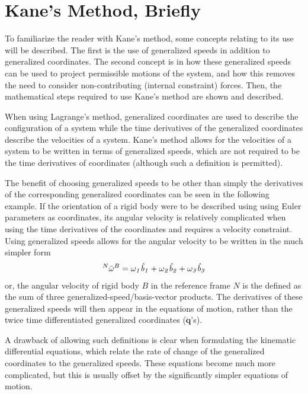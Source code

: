 \documentclass[smallcondensed,final]{svjour3}                     %
\begin{document}
\section{Kane's Method, Briefly}
\label{sec:kane_method}
To familiarize the reader with Kane's method, some concepts relating to its
use will be described.
The first is the use of generalized speeds in addition to generalized
coordinates.
The second concept is in how these generalized speeds can be used to project
permissible motions of the system, and how this removes the need to consider
non-contributing (internal constraint) forces.
Then, the mathematical steps required to use Kane's method are shown and
described.

When using Lagrange's method, generalized coordinates are used to describe the
configuration of a system while the time derivatives of the generalized
coordinates describe the velocities of a system.
Kane's method allows for the velocities of a system to be written in terms of
generalized speeds, which are not required to be the time derivatives of
coordinates (although such a definition is permitted).

The benefit of choosing generalized speeds to be other than simply the
derivatives of the corresponding generalized coordinates can be seen in the
following example.
If the orientation of a rigid body were to be described using using Euler
parameters as coordinates, its angular velocity is relatively complicated when
using the time derivatives of the coordinates and requires a velocity
constraint.
Using generalized speeds allows for the angular velocity to be written in the
much simpler form
\begin{align}
\label{eq:ex1}
{^N}\bar{\omega}^B = \it{\omega}_1 \hat{b}_1 + \it{\omega}_2 \hat{b}_2 +
\it{\omega}_3 \hat{b}_3
\end{align}
or, the angular velocity of rigid body $B$ in the reference frame $N$ is the
defined as the sum of three generalized-speed/basis-vector products.
The derivatives of these generalized speeds will then appear in the equations
of motion, rather than the twice time differentiated generalized coordinates
($\ddot{\mathbf{q}}$'s).

A drawback of allowing such definitions is clear when formulating the kinematic
differential equations, which relate the rate of change of the generalized
coordinates to the generalized speeds.
These equations become much more complicated, but this is usually offset by the
significantly simpler equations of motion.
\end{document}

